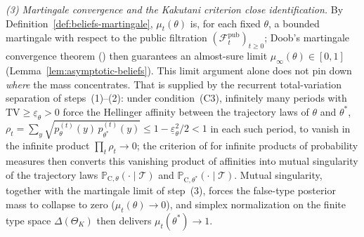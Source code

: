 \documentclass[review,authoryear,12pt]{elsarticle}
\theoremstyle{plain}
\theoremstyle{definition}
\newcommand{\ProbC}[1]{\mathbb{P}_{\mathrm{C},#1}}
\newcommand{\ThetaK}{\Theta_K}
\newcommand{\1}{\mathbf{1}}
\begin{document}
\emph{(3) Martingale convergence and the Kakutani criterion close identification.} By Definition~\ref{def:beliefs-martingale}, $\mu_t(\theta)$ is, for each fixed $\theta$, a bounded martingale with respect to the public filtration $(\mathcal F_t^{\mathrm{pub}})_{t\ge0}$; Doob's martingale convergence theorem (\citealt{Doob1953Stochastic}) then guarantees an almost-sure limit $\mu_\infty(\theta)\in[0,1]$ (Lemma~\ref{lem:asymptotic-beliefs}). This limit argument alone does not pin down \emph{where} the mass concentrates. That is supplied by the recurrent total-variation separation of steps~(1)--(2): under condition~(C3), infinitely many periods with $\mathrm{TV}\ge\underline\varepsilon_\theta>0$ force the Hellinger affinity between the trajectory laws of $\theta$ and $\theta^\ast$, $\rho_t=\sum_y\sqrt{p_\theta^{(t)}(y)\,p_{\theta^\ast}^{(t)}(y)}\le 1-\underline\varepsilon_\theta^2/2<1$ in each such period, to vanish in the infinite product $\prod_t\rho_t\to0$; the criterion of \citet{Kakutani1948} for infinite products of probability measures then converts this vanishing product of affinities into mutual singularity of the trajectory laws $\ProbC\theta(\cdot\mid\mathcal T)$ and $\ProbC{\theta^\ast}(\cdot\mid\mathcal T)$. Mutual singularity, together with the martingale limit of step~(3), forces the false-type posterior mass to collapse to zero ($\mu_t(\theta)\to0$), and simplex normalization on the finite type space $\Delta(\ThetaK)$ then delivers $\mu_t(\theta^\ast)\to1$.
\end{document}
